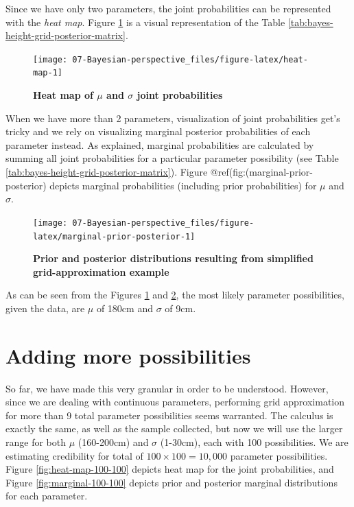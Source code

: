 \documentclass[
]{book}
\begin{document}
Since we have only two parameters, the joint probabilities can be represented with the \emph{heat map}. Figure \ref{fig:heat-map} is a visual representation of the Table \ref{tab:bayes-height-grid-posterior-matrix}.

\begin{figure}

{\centering \texttt{[image: 07-Bayesian-perspective\_files/figure-latex/heat-map-1]} 

}

\caption{\textbf{Heat map of \(\mu\) and \(\sigma\) joint probabilities}}\label{fig:heat-map}
\end{figure}



When we have more than 2 parameters, visualization of joint probabilities get's tricky and we rely on visualizing marginal posterior probabilities of each parameter instead. As explained, marginal probabilities are calculated by summing all joint probabilities for a particular parameter possibility (see Table \ref{tab:bayes-height-grid-posterior-matrix}). Figure @ref(fig:(marginal-prior-posterior) depicts marginal probabilities (including prior probabilities) for \(\mu\) and \(\sigma\).

\begin{figure}

{\centering \texttt{[image: 07-Bayesian-perspective\_files/figure-latex/marginal-prior-posterior-1]} 

}

\caption{\textbf{Prior and posterior distributions resulting from simplified grid-approximation example}}\label{fig:marginal-prior-posterior}
\end{figure}



As can be seen from the Figures \ref{fig:heat-map} and \ref{fig:marginal-prior-posterior}, the most likely parameter possibilities, given the data, are \(\mu\) of 180cm and \(\sigma\) of 9cm.

\hypertarget{adding-more-possibilities}{%
\section{Adding more possibilities}\label{adding-more-possibilities}}

So far, we have made this very granular in order to be understood. However, since we are dealing with continuous parameters, performing grid approximation for more than 9 total parameter possibilities seems warranted. The calculus is exactly the same, as well as the sample collected, but now we will use the larger range for both \(\mu\) (160-200cm) and \(\sigma\) (1-30cm), each with 100 possibilities. We are estimating credibility for total of \(100 \times 100 = 10,000\) parameter possibilities. Figure \ref{fig:heat-map-100-100} depicts heat map for the joint probabilities, and Figure \ref{fig:marginal-100-100} depicts prior and posterior marginal distributions for each parameter.
\end{document}
